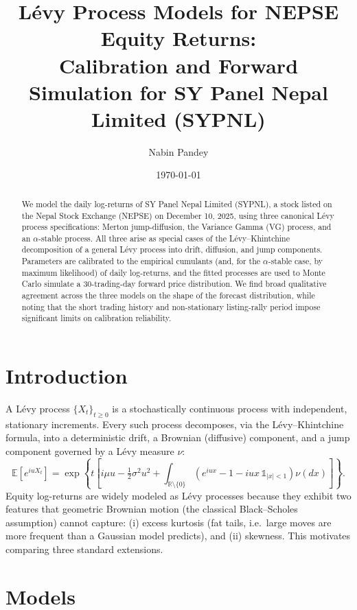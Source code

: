 \documentclass[11pt]{article}
\title{\vspace{-1.5em}Lévy Process Models for NEPSE Equity Returns:\\
\large Calibration and Forward Simulation for SY Panel Nepal Limited (SYPNL)}
\author[1]{Nabin Pandey}
\affil[1]{Department of Physics, Tri-Chandra Multiple Campus, Tribhuvan University, Kathmandu, Nepal}
\date{\today}
\begin{document}
\maketitle
\vspace{-1.5em}

\begin{abstract}
\noindent We model the daily log-returns of SY Panel Nepal Limited (SYPNL), a stock listed on the Nepal Stock Exchange (NEPSE) on December 10, 2025, using three canonical Lévy process specifications: Merton jump-diffusion, the Variance Gamma (VG) process, and an $\alpha$-stable process. All three arise as special cases of the Lévy--Khintchine decomposition of a general Lévy process into drift, diffusion, and jump components. Parameters are calibrated to the empirical cumulants (and, for the $\alpha$-stable case, by maximum likelihood) of daily log-returns, and the fitted processes are used to Monte Carlo simulate a 30-trading-day forward price distribution. We find broad qualitative agreement across the three models on the shape of the forecast distribution, while noting that the short trading history and non-stationary listing-rally period impose significant limits on calibration reliability.
\end{abstract}

\section{Introduction}
A Lévy process $\{X_t\}_{t\ge 0}$ is a stochastically continuous process with independent, stationary increments. Every such process decomposes, via the Lévy--Khintchine formula, into a deterministic drift, a Brownian (diffusive) component, and a jump component governed by a Lévy measure $\nu$:
\begin{equation}
\mathbb{E}\left[e^{iuX_t}\right] = \exp\left\{t\left[i\mu u - \tfrac{1}{2}\sigma^2 u^2 + \int_{\mathbb{R}\setminus\{0\}}\left(e^{iux}-1-iux\,\mathbb{1}_{|x|<1}\right)\nu(dx)\right]\right\}.
\label{eq:lk}
\end{equation}
Equity log-returns are widely modeled as Lévy processes because they exhibit two features that geometric Brownian motion (the classical Black--Scholes assumption) cannot capture: (i) excess kurtosis (fat tails, i.e.\ large moves are more frequent than a Gaussian model predicts), and (ii) skewness. This motivates comparing three standard extensions.

\section{Models}
\end{document}

